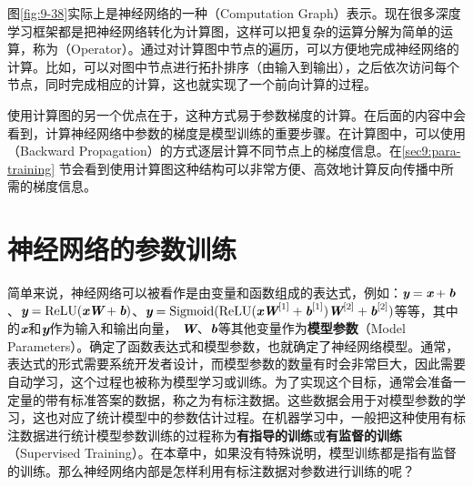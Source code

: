 \parinterval 图\ref{fig:9-38}实际上是神经网络的一种{\small{}}（Computation Graph）表示。现在很多深度学习框架都是把神经网络转化为计算图，这样可以把复杂的运算分解为简单的运算，称为{\small{}}（Operator）。通过对计算图中节点的遍历，可以方便地完成神经网络的计算。比如，可以对图中节点进行拓扑排序（由输入到输出），之后依次访问每个节点，同时完成相应的计算，这也就实现了一个前向计算的过程。

\parinterval 使用计算图的另一个优点在于，这种方式易于参数梯度的计算。在后面的内容中会看到，计算神经网络中参数的梯度是模型训练的重要步骤。在计算图中，可以使用{\small{}} （Backward Propagation）的方式逐层计算不同节点上的梯度信息。在\ref{sec9:para-training} 节会看到使用计算图这种结构可以非常方便、高效地计算反向传播中所需的梯度信息。


\sectionnewpage
\section{神经网络的参数训练}

\parinterval 简单来说，神经网络可以被看作是由变量和函数组成的表达式，例如：$ {\textbf{\em y}}={\textbf{\em x}}+{\textbf{\em b}} $、$ {\textbf{\em y}}={\textrm{ReLU}}({\textbf{\em x}} {\textbf{\em W}}+{\textbf{\em b}}) $、$ {\textbf{\em y}}={\textrm{Sigmoid}}({\textrm{ReLU}}({\textbf{\em x}}{\textbf{\em W}}^{[1]}+{\textbf{\em b}}^{[1]}){\textbf{\em W}}^{[2]}+{\textbf{\em b}}^{[2]}) $等等，其中的$ {\textbf{\em x}} $和$ {\textbf{\em y}} $作为输入和输出向量， ${\textbf{\em W}}$、${\textbf{\em b}}$等其他变量作为{\small\sffamily\bfseries{模型参数}}（Model Parameters）。确定了函数表达式和模型参数，也就确定了神经网络模型。通常，表达式的形式需要系统开发者设计，而模型参数的数量有时会非常巨大，因此需要自动学习，这个过程也被称为模型学习或训练。为了实现这个目标，通常会准备一定量的带有标准答案的数据，称之为有标注数据。这些数据会用于对模型参数的学习，这也对应了统计模型中的参数估计过程。在机器学习中，一般把这种使用有标注数据进行统计模型参数训练的过程称为{\small\sffamily\bfseries{有指导的训练}}或{\small\sffamily\bfseries{有监督的训练}}（Supervised Training）。在本章中，如果没有特殊说明，模型训练都是指有监督的训练。那么神经网络内部是怎样利用有标注数据对参数进行训练的呢？

